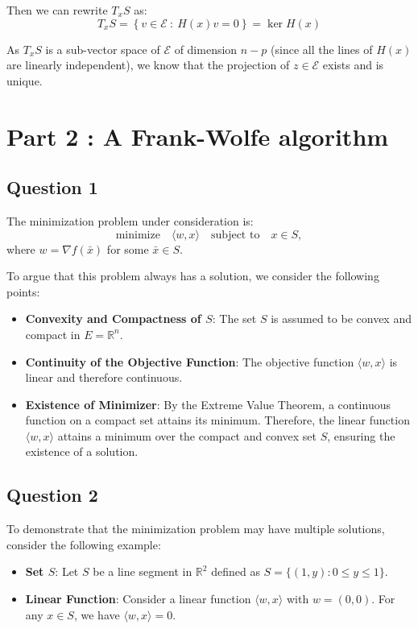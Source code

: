 \documentclass[12p]{article}
\newcommand*{\es}{\mathcal{E}}
\begin{document}
Then we can rewrite \(T_xS\) as:
\[
  T_xS=\left\{v\in \es \ : \ H(x)v=0\right\} =\ker H(x)  
\]

As \(T_xS\) is a sub-vector space of \(\es\) of dimension \(n-p\) (since all the lines of \(H(x)\) are linearly independent), we know that the projection of \(z\in \es\) exists and is unique.


\newpage


\section*{Part 2 : A Frank-Wolfe algorithm} 


\subsection*{Question 1} 

The minimization problem under consideration is:
\begin{equation}
    \text{minimize} \quad \langle w, x \rangle \quad \text{subject to} \quad x \in S,
\end{equation}
where \( w = \nabla f(\bar{x}) \) for some \( \bar{x} \in S \).

To argue that this problem always has a solution, we consider the following points:

\begin{itemize}
    \item \textbf{Convexity and Compactness of \( S \)}: The set \( S \) is assumed to be convex and compact in \( E = \mathbb{R}^n \).
    \item \textbf{Continuity of the Objective Function}: The objective function \( \langle w, x \rangle \) is linear and therefore continuous.
    \item \textbf{Existence of Minimizer}: By the Extreme Value Theorem, a continuous function on a compact set attains its minimum. Therefore, the linear function \( \langle w, x \rangle \) attains a minimum over the compact and convex set \( S \), ensuring the existence of a solution.
\end{itemize}

\subsection*{Question 2} 
To demonstrate that the minimization problem may have multiple solutions, consider the following example:

\begin{itemize}
    \item \textbf{Set \( S \)}: Let \( S \) be a line segment in \( \mathbb{R}^2 \) defined as \( S = \{ (1, y) : 0 \leq y \leq 1 \} \).
    \item \textbf{Linear Function}: Consider a linear function \( \langle w, x \rangle \) with \( w = (0, 0) \). For any \( x \in S \), we have \( \langle w, x \rangle = 0 \).
\end{itemize}
\end{document}
